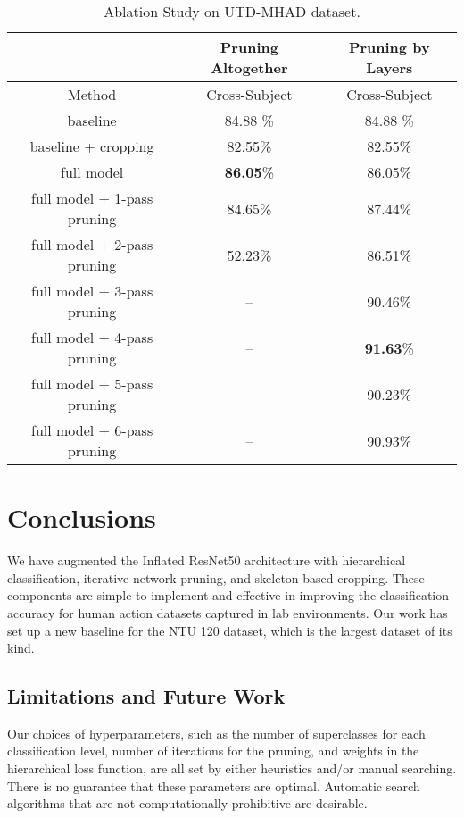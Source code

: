 \documentclass{article}
\begin{document}
\begin{table*}
\begin{center}
\caption{Ablation Study on UTD-MHAD dataset.}
\label{tbl:UTD_ab}
\begin{tabular}{|c|c|c|}
\hline
 & Pruning Altogether & Pruning by Layers\\
\hline
Method & Cross-Subject & Cross-Subject \\
\hline
baseline & 84.88 \% & 84.88 \% \\
baseline + cropping & 82.55\% & 82.55\% \\
full model& \textbf{86.05}\% & 86.05\% \\
full model + 1-pass pruning & 84.65\% & 87.44\% \\
full model + 2-pass pruning & 52.23\% & 86.51\% \\
full model + 3-pass pruning & -- & 90.46\% \\
full model + 4-pass pruning & -- & \textbf{91.63}\%\\
full model + 5-pass pruning & -- & 90.23\% \\
full model + 6-pass pruning & -- & 90.93\% \\

\hline
\end{tabular}
\end{center}
\end{table*} \section{Conclusions}
{We have augmented the Inflated ResNet50 architecture with hierarchical classification, iterative network pruning, and skeleton-based cropping. These components are simple to implement and effective in improving the classification accuracy for human action datasets captured in lab environments. Our work has set up a new baseline for the NTU 120 dataset, which is the largest dataset of its kind.} 

\subsection{Limitations and Future Work}
{Our choices of hyperparameters, such as the number of superclasses for each classification level, number of iterations for the pruning, and weights in the hierarchical loss function, are all set by either heuristics and/or manual searching. There is no guarantee that these parameters are optimal. Automatic search algorithms that are not computationally prohibitive are desirable.} 
\end{document}
